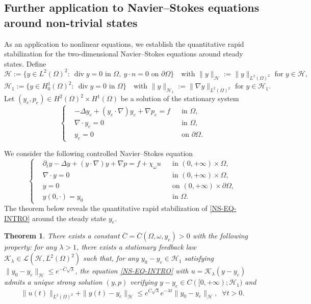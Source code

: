 \documentclass[a4paper]{article}
\newtheorem{theorem}{Theorem}[section]
\numberwithin{equation}{section}
\begin{document}
\subsection{Further application to Navier--Stokes equations around non-trivial states}
As an application to nonlinear equations, we establish the quantitative rapid stabilization for the two-dimensional Navier--Stokes equations around steady states. Define
$$\mathcal H:=\{y\in L^2(\Omega)^2:\ \operatorname{div}y=0\text{ in }\Omega,\ y\cdot n=0\text{ on }\partial\Omega\}\quad \text{with }\|y\|_{\mathcal H}:=\|y\|_{L^2(\Omega)^2} \text{ for }y\in \mathcal H,$$ 
$$\mathcal H_1:=\{y\in H^1_0(\Omega)^2:\ \operatorname{div}y=0\text{ in }\Omega\}\quad \text{with }\|y\|_{\mathcal H_1}:=\|\nabla y\|_{L^2(\Omega)^2}\text{ for }y\in \mathcal H_1.$$  
Let $(y_e,p_e)\in H^2(\Omega)^2\times H^1(\Omega)$ be a solution of the stationary system
$$\left\{\begin{aligned}
&- \Delta y_e + (y_e\cdot \nabla)y_e + \nabla p_e = f && \text{in } \Omega,\\
&\nabla \cdot y_e = 0 && \text{in } \Omega,\\
&y_e = 0 && \text{on } \partial\Omega.
\end{aligned}\right.$$ 

We consider the following controlled Navier--Stokes equation
\begin{equation}\label{NS-EQ-INTRO}
\left\{\begin{aligned}
&\partial_t y -  \Delta y + (y\cdot \nabla)y + \nabla p = f+\chi_\omega u && \text{in } (0,+\infty)\times \Omega,\\
&\nabla \cdot y = 0 && \text{in }  (0,+\infty)\times \Omega,\\
&y = 0 && \text{on }   (0,+\infty)\times \partial \Omega,\\
&y(0,\cdot)=y_0&& \text{in } \Omega.
\end{aligned}\right.
\end{equation} 
The theorem below reveals the quantitative rapid stabilization of \eqref{NS-EQ-INTRO} around the steady state $y_e$.

\begin{theorem}\label{main-th-rapid-stab-NS}
There exists a constant $\overline{C}=\overline{C}\left(\Omega,\omega,y_e\right)>0$ with the following property: for any $\lambda>1$, there exists a stationary feedback law $\mathcal{K}_{\lambda}\in\mathcal{L}(\mathcal H,L^2(\Omega)^2)$ such that, for any $y_0-y_e\in \mathcal H_1$ satisfying $\|y_0-y_e\|_{\mathcal H}\le e^{-\overline{C}\sqrt{\lambda}}$, the equation \eqref{NS-EQ-INTRO} with $u=\mathcal{K}_{\lambda}(y-y_e)$ admits a unique strong solution $(y,p)$ verifying
$y-y_e\in C([0,+\infty);\mathcal H_1)$ and
\begin{equation}\label{y-decay-2-NS}
\|u(t)\|_{L^2(\Omega)^2}+\|y(t)-y_e\|_{\mathcal H}\le e^{\overline{C}\sqrt{\lambda}}e^{-\lambda t}\|y_0-y_e\|_{  \mathcal H},\;\; \forall t>0.
\end{equation}
\end{theorem}
\end{document}
